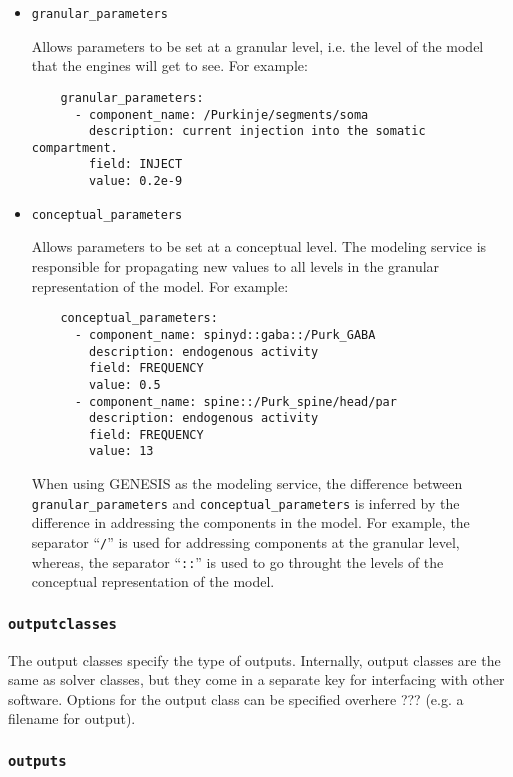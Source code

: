 \documentclass[12pt]{article}
\begin{document}
\begin{itemize}

\item[ ] {\tt granular\_parameters}

Allows parameters to be set at a granular level, i.e. the level of the model that the engines will get to see. For example: 

\begin{verbatim}
    granular_parameters:
      - component_name: /Purkinje/segments/soma
        description: current injection into the somatic compartment.
        field: INJECT
        value: 0.2e-9
\end{verbatim}

\item[ ]{\tt conceptual\_parameters}

Allows parameters to be set at a conceptual level. The modeling service is responsible for propagating new values to all levels in the granular representation of the model. For example:

\begin{verbatim}
    conceptual_parameters:
      - component_name: spinyd::gaba::/Purk_GABA
        description: endogenous activity
        field: FREQUENCY
        value: 0.5
      - component_name: spine::/Purk_spine/head/par
        description: endogenous activity
        field: FREQUENCY
        value: 13
\end{verbatim}
When using GENESIS as the modeling service, the difference between {\tt granular\_parameters} and {\tt conceptual\_parameters} is inferred by the difference in addressing the components in the model. For example, the separator ``{\tt /}'' is used for addressing components at the granular level, whereas, the separator ``{\tt ::}'' is used to go throught the levels of the conceptual representation of the model.

\end{itemize}

\subsubsection*{\tt outputclasses}

The output classes specify the type of outputs. Internally, output classes are the same as solver classes, but they come in a separate key for interfacing with other software. Options for the output class can be specified overhere ??? (e.g. a filename for output). 

\subsubsection*{\tt outputs}
\end{document}
